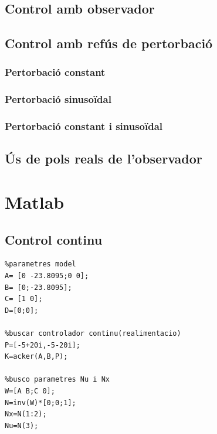 \documentclass[12pt,a4paper,final,twoside,openright]{report}
\begin{document}
\section{Control amb observador}

\section{Control amb refús de pertorbació}

\subsection{Pertorbació constant}

\subsection{Pertorbació sinusoïdal}

\subsection{Pertorbació constant i sinusoïdal}

\section{Ús de pols reals de l'observador}

%


\appendix
\clearpage %
\addappheadtotoc
\appendixpage

\chapter{Matlab}

\section{Control continu}\label{ann:mat_cont}
\begin{verbatim}
%parametres model
A= [0 -23.8095;0 0];
B= [0;-23.8095];
C= [1 0];
D=[0;0];

%buscar controlador continu(realimentacio)
P=[-5+20i,-5-20i];
K=acker(A,B,P);

%busco parametres Nu i Nx
W=[A B;C 0];
N=inv(W)*[0;0;1];
Nx=N(1:2);
Nu=N(3);
\end{verbatim}
\end{document}
